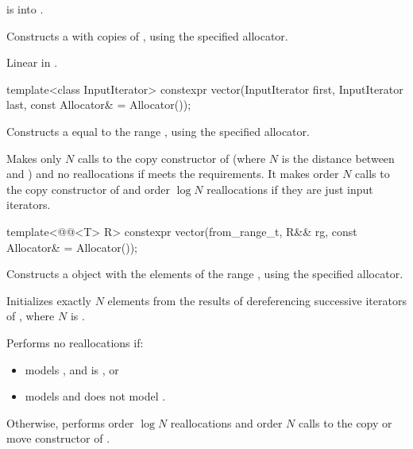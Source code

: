 \begin{itemdescr}
\pnum
\expects
{} is
 into .

\pnum
\effects
Constructs a  with 
copies of , using the specified allocator.

\pnum
\complexity
Linear in .
\end{itemdescr}

\begin{itemdecl}
template<class InputIterator>
  constexpr vector(InputIterator first, InputIterator last,
                   const Allocator& = Allocator());
\end{itemdecl}

\begin{itemdescr}
\pnum
\effects
Constructs a  equal to the
range , using the specified allocator.

\pnum
\complexity
Makes only $N$
calls to the copy constructor of
(where $N$
is the distance between
and
)
and no reallocations if
 meets the  requirements.
It makes order
$N$
calls to the copy constructor of
and order
$\log N$
reallocations if they are just input iterators.
\end{itemdescr}

%
\begin{itemdecl}
template<@@<T> R>
  constexpr vector(from_range_t, R&& rg, const Allocator& = Allocator());
\end{itemdecl}

\begin{itemdescr}
\pnum
\effects
Constructs a  object with the elements of the range ,
using the specified allocator.

\pnum
\complexity
Initializes exactly $N$ elements
from the results of dereferencing successive iterators of ,
where $N$ is .

\pnum
Performs no reallocations if:
\begin{itemize}
\item
{} models , and
 is , or
\item
{} models  and
 does not model .
\end{itemize}
Otherwise, performs order $\log N$ reallocations and
order $N$ calls to the copy or move constructor of .
\end{itemdescr}

